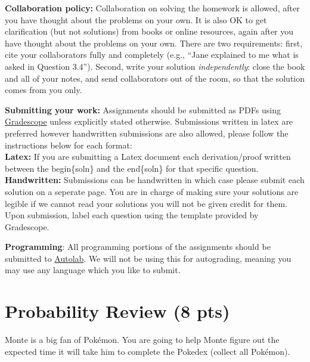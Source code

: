 \documentclass{article}
\begin{document}
\begin{itemize*}
\item \textbf{Collaboration policy:} Collaboration on solving the homework is allowed, after you have thought about the problems on your own.  It is also OK to get clarification (but not solutions) from books or online resources, again after you have thought about the problems on your own.  There are two requirements: first, cite your collaborators fully and completely (e.g., ``Jane explained to me what is asked in Question 3.4'').  Second, write your solution {\em independently}: close the book and all of your notes, and send collaborators out of the room, so that the solution comes from you only.

\vspace{0.1in}
\item\textbf{Submitting your work:} Assignments should be submitted as PDFs using \href{https://gradescope.com/}{Gradescope} unless explicitly stated otherwise.  Submissions written in latex are preferred however handwritten submissions are also allowed, please follow the instructions below for each format:\\
\textbf{Latex:} If you are submitting a Latex document each derivation/proof written between the begin\{soln\} and the end\{soln\} for that specific question. \\
\textbf{Handwritten:} Submissions can be handwritten in which case please submit each solution on a seperate page. You are in charge of making sure your solutions are legible if we cannot read your solutions you will not be given credit for them.\\
Upon submission, label each question using the template provided by Gradescope. 

\vspace{0.1in}
\item \textbf{Programming}: All programming portions of the assignments should be submitted to \href{https://autolab.andrew.cmu.edu/courses/10701-f18/assessments}{Autolab}.  We will not be using this for autograding, meaning you may use any language which you like to submit.
\end{itemize*}

\newpage
\section{Probability Review (8 pts)}

Monte is a big fan of Pok{\'e}mon. You are going to help Monte figure out the expected time it will take him to complete the Pokedex (collect all Pok{\'e}mon).
  
\end{document}
